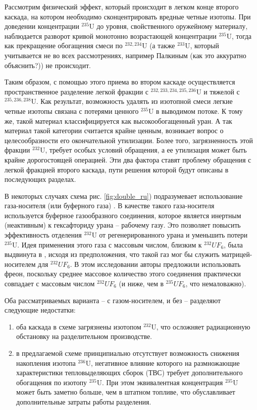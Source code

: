 Рассмотрим физический эффект, который происходит в легком конце второго каскада, на котором необходимо сконцентрировать вредные четные изотопы.
При доведении концентрации $^{235}$U до уровня, свойственного оружейному материалу, наблюдается разворот кривой монотонно возрастающей концентрации $^{235}$U, тогда как прекращение обогащения смеси по $^{232,234}$U (а также $^{233}$U, который учитывается не во всех рассмотрениях, например Палкиным (как это аккуратно объяснить?)) не происходит.

Таким образом, с помощью этого приема во втором каскаде осуществляется пространственное разделение легкой фракции с $^{232,233,234,235,236}$U и тяжелой с $^{235,236,238}$U.
Как результат, возможность удалять из изотопной смеси легкие четные изотопы связана с потерями ценного $^{235}$U в выводимом потоке.
К тому же, такой материал классифицируется как высокообогащенный уран.
А так материал такой категории считается крайне ценным, возникает вопрос о целесообразности его окончательной утилизации.
Более того, загрязненность этой фракции $^{232}$U, требует особых условий обращения, а ее утилизация может быть крайне дорогостоящей операцией.
Эти два фактора ставят проблему обращения с легкой фракцией второго каскада, пути решения которой будут описаны в последующих разделах.

В некоторых случаях схема рис. \ref{fig:double_ru}) подразумевает использование газа-носителя (или буферного газа) \cite{prusakovCorrectingIsotopicComposition2008, SposobIzotopnogoVosstanovleniyab}.
В качестве такого газа-носителя используется буферное газообразного соединения, которое является инертным (неактивным) к гексафториду урана -- рабочему газу. 
Это позволяет повысить эффективность отделения $^{232}$U от регенерированного урана и уменьшить потери $^{235}$U.
Идея применения этого газа с массовым числом, близким к $^{232}UF_6$, была выдвинута в \cite{SosninYuChelcov}, исходя из предположения, что такой газ мог бы служить матрицей-носителем для $^{232}UF_6$.
В этом исследовании авторы предложили использовать фреон, поскольку среднее массовое количество этого соединения практически совпадает с массовым числом $^{232}UF_6$ (и ниже, чем в $^{235}UF_6$, что немаловажно).

Оба рассматриваемых варианта -- с газом-носителем, и без -- разделяют следующие недостатки:
\begin{enumerate}
  \item оба каскада в схеме загрязнены изотопом $^{232}$U, что осложняет радиационную обстановку на разделительном производстве.
  \item в предлагаемой схеме принципиально отсутствует возможность снижения накопления изотопа $^{236}$U, негативное влияние которого на размножающие характеристики тепловыделяющих сборок (ТВС) требует дополнительного обогащения по изотопу $^{235}$U. При этом эквивалентная концентрация $^{235}$U может быть заметно больше, чем в штатном топливе, что обуславливает дополнительные затраты работы разделения.
\end{enumerate}

